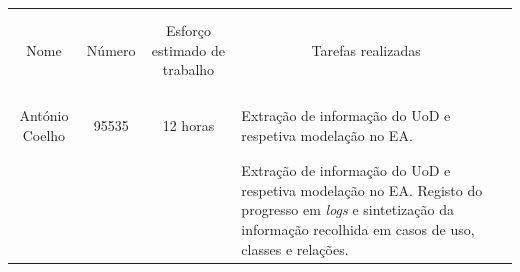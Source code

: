 \documentclass{article}
\begin{document}
    \begin{table}[H]
        \centering
        \begin{tabular}{|l|l|l|l|l}
        \cline{1-4}
        \multicolumn{1}{|l|}{}                   & \multicolumn{1}{l|}{}       & \multicolumn{1}{l|}{}                             & \multicolumn{1}{l|}{}                   &  \\
        \multicolumn{1}{|l|}{}                   & \multicolumn{1}{l|}{}       & \multicolumn{1}{l|}{}                             & \multicolumn{1}{l|}{}                   &  \\
        \multicolumn{1}{|c|}{Nome}               & \multicolumn{1}{c|}{Número} & \multicolumn{1}{c|}{Esforço estimado de trabalho} & \multicolumn{1}{c|}{Tarefas realizadas} &  \\
        \multicolumn{1}{|l|}{}                   & \multicolumn{1}{l|}{}       & \multicolumn{1}{l|}{}                             & \multicolumn{1}{l|}{}                   &  \\
        \multicolumn{1}{|l|}{}                   & \multicolumn{1}{l|}{}       & \multicolumn{1}{l|}{}                             & \multicolumn{1}{l|}{}                   &  \\ \cline{1-4}
        \multicolumn{1}{|l|}{}                   & \multicolumn{1}{l|}{}       & \multicolumn{1}{l|}{}                             & \multirow{5}{7cm}{Extração de informação do UoD e respetiva modelação no EA.}                   &  \\
        \multicolumn{1}{|l|}{}                   & \multicolumn{1}{l|}{}       & \multicolumn{1}{l|}{}                             & \multicolumn{1}{l|}{}                   &  \\
        \multicolumn{1}{|c|}{António Coelho}     & \multicolumn{1}{c|}{95535}  & \multicolumn{1}{c|}{12 horas}                     & \multicolumn{1}{l|}{}                   &  \\
        \multicolumn{1}{|l|}{}                   & \multicolumn{1}{l|}{}       & \multicolumn{1}{l|}{}                             & \multicolumn{1}{l|}{}                   &  \\
        \multicolumn{1}{|l|}{}                   & \multicolumn{1}{l|}{}       & \multicolumn{1}{l|}{}                             & \multicolumn{1}{l|}{}                   & \\ \cline{1-4}
        \multicolumn{1}{|l|}{}                   & \multicolumn{1}{l|}{}       & \multicolumn{1}{l|}{}                             & \multirow{5}{7cm}{Extração de informação do UoD e respetiva modelação no EA. Registo do progresso em \textit{logs} e sintetização da informação recolhida em casos de uso, classes e relações.}                   &   \\

\end{tabular}
\end{table}
\end{document}
